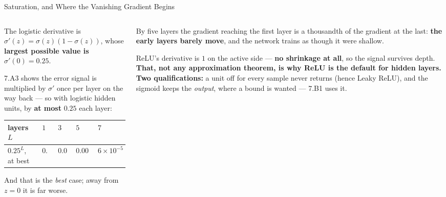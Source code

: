 \begin{frame}{Saturation, and Where the Vanishing Gradient Begins}
\begin{columns}[T]
\begin{column}{0.54\textwidth}
\small
The logistic derivative is $\sigma'(z)=\sigma(z)(1-\sigma(z))$, whose \textbf{largest possible value is} $\sigma'(0)=0.25$.
\smallskip

7.A3 shows the error signal is multiplied by $\sigma'$ once per layer on the way back --- so with logistic hidden units, by \textbf{at most} $0.25$ each layer:

\begin{center}\footnotesize
\begin{tabularx}{\linewidth}{@{}>{\raggedright\arraybackslash}p{1.9cm} >{\raggedleft\arraybackslash}X >{\raggedleft\arraybackslash}X >{\raggedleft\arraybackslash}X >{\raggedleft\arraybackslash}X@{}}
\toprule
layers $L$ & $1$ & $3$ & $5$ & $7$ \\
\midrule
$0.25^{L}$, at best & $0.25$ & $0.016$ & $\mathbf{0.00098}$ & $6\times10^{-5}$ \\
\bottomrule
\end{tabularx}
\end{center}
{\footnotesize And that is the \emph{best} case; away from $z=0$ it is far worse.}
\end{column}
\begin{column}{0.43\textwidth}
\begin{cautionbox}[title=\textbf{The consequence}]\footnotesize
By five layers the gradient reaching the first layer is a thousandth of the gradient at the last: \textbf{the early layers barely move}, and the network trains as though it were shallow.
\end{cautionbox}
\smallskip
\begin{takeawaybox}\footnotesize
ReLU's derivative is $1$ on the active side --- \textbf{no shrinkage at all}, so the signal survives depth. \textbf{That, not any approximation theorem, is why ReLU is the default for hidden layers.}
\medskip
\textbf{Two qualifications:} a unit off for every sample never returns (hence Leaky ReLU), and the sigmoid keeps the \emph{output}, where a bound is wanted --- 7.B1 uses it.
\end{takeawaybox}
\end{column}
\end{columns}
\vspace{1mm}
\end{frame}

